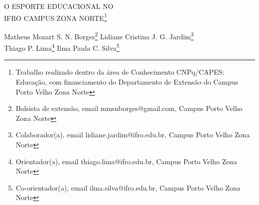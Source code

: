 \documentclass[article,12pt,onesidea,4paper,english,brazil]{abntex2}
\begin{document}
	
	
	\frenchspacing 
	
	\begin{center}
		\LARGE O ESPORTE EDUCACIONAL NO\\IFRO CAMPUS ZONA NORTE\footnote{Trabalho realizado dentro da área de Conhecimento CNPq/CAPES: Educação, com financiamento do Departamento de Extensão do Campus Porto Velho Zona Norte}
		
		\normalsize
		Matheus Mozart S. N. Borges\footnote{Bolsista de extensão, email mmsnborges@gmail.com, Campus Porto Velho Zona Norte} 
		Lidiane Cristina J. G. Jardim\footnote{Colaborador(a), email lidiane.jardim@ifro.edu.br, Campus Porto Velho Zona Norte} \\
		Thiago P. Lima\footnote{Orientador(a), email thiago.lima@ifro.edu.br, Campus Porto Velho Zona Norte} 
		Ilma Paula C. Silva\footnote{Co-orientador(a), email ilma.silva@ifro.edu.br, Campus Porto Velho Zona Norte} 
	\end{center}
	
\end{document}
